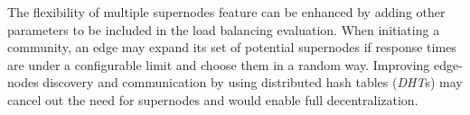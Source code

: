
The flexibility of multiple supernodes feature can be enhanced by adding other parameters to be included in the load balancing evaluation. When initiating a community, an edge may expand its set of potential supernodes if response times are under a configurable limit and choose them in a random way. Improving edge-nodes discovery and communication by using distributed hash tables (\emph{DHT}s) may cancel out the need for supernodes and would enable full decentralization.
